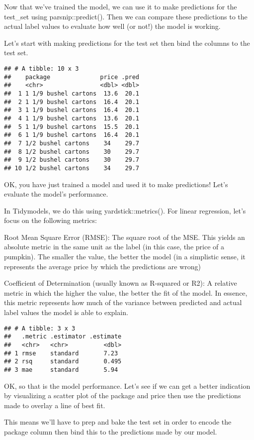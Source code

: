 \documentclass[
]{article}
\begin{document}
Now that we've trained the model, we can use it to make predictions for
the test\_set using parsnip::predict(). Then we can compare these
predictions to the actual label values to evaluate how well (or not!)
the model is working.

Let's start with making predictions for the test set then bind the
columns to the test set.

\begin{verbatim}
## # A tibble: 10 x 3
##    package              price .pred
##    <chr>                <dbl> <dbl>
##  1 1 1/9 bushel cartons  13.6  20.1
##  2 1 1/9 bushel cartons  16.4  20.1
##  3 1 1/9 bushel cartons  16.4  20.1
##  4 1 1/9 bushel cartons  13.6  20.1
##  5 1 1/9 bushel cartons  15.5  20.1
##  6 1 1/9 bushel cartons  16.4  20.1
##  7 1/2 bushel cartons    34    29.7
##  8 1/2 bushel cartons    30    29.7
##  9 1/2 bushel cartons    30    29.7
## 10 1/2 bushel cartons    34    29.7
\end{verbatim}

OK, you have just trained a model and used it to make predictions! Let's
evaluate the model's performance.

In Tidymodels, we do this using yardstick::metrics(). For linear
regression, let's focus on the following metrics:

Root Mean Square Error (RMSE): The square root of the MSE. This yields
an absolute metric in the same unit as the label (in this case, the
price of a pumpkin). The smaller the value, the better the model (in a
simplistic sense, it represents the average price by which the
predictions are wrong)

Coefficient of Determination (usually known as R-squared or R2): A
relative metric in which the higher the value, the better the fit of the
model. In essence, this metric represents how much of the variance
between predicted and actual label values the model is able to explain.

\begin{verbatim}
## # A tibble: 3 x 3
##   .metric .estimator .estimate
##   <chr>   <chr>          <dbl>
## 1 rmse    standard       7.23 
## 2 rsq     standard       0.495
## 3 mae     standard       5.94
\end{verbatim}

OK, so that is the model performance. Let's see if we can get a better
indication by visualizing a scatter plot of the package and price then
use the predictions made to overlay a line of best fit.

This means we'll have to prep and bake the test set in order to encode
the package column then bind this to the predictions made by our model.
\end{document}
